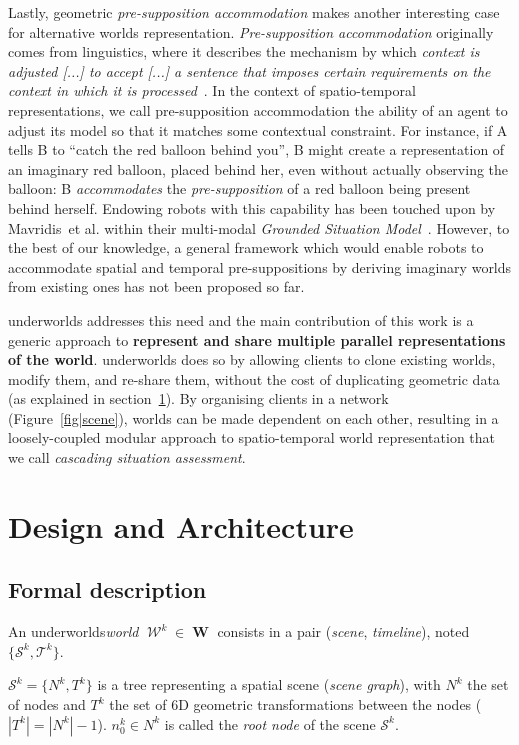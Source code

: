 \documentclass[letterpaper, 10pt, conference]{ieeeconf}
\newcommand{\etal}{et al.\xspace}
\newcommand{\uwds}{{\sc underworlds}\xspace}
\DeclareMathOperator{\W}{\mathcal{W}}
\DeclareMathOperator{\Ws}{\boldsymbol{W}}
\begin{document}
Lastly, geometric \emph{pre-supposition accommodation} makes another interesting
case for alternative worlds representation. \emph{Pre-supposition accommodation}
originally comes from linguistics, where it describes the mechanism by which
\emph{context is adjusted [...] to accept [...] a sentence that imposes certain
requirements on the context in which it is
processed}~\cite{vonfintel2008presupposition}. In the context of spatio-temporal
representations, we call pre-supposition accommodation the ability of an agent
to adjust its model so that it matches some contextual constraint. For instance,
if A tells B to ``catch the red balloon behind you'', B might create a
representation of an imaginary red balloon, placed behind her, even without
actually observing the balloon: B \emph{accommodates} the \emph{pre-supposition}
of a red balloon being present behind herself. Endowing robots with this
capability has been touched upon by Mavridis~\etal within their multi-modal
\emph{Grounded Situation Model}~\cite{Mavridis2006}. However, to the best of our
knowledge, a general framework which would enable robots to accommodate spatial
and temporal pre-suppositions by deriving imaginary worlds from existing ones
has not been proposed so far.

\uwds addresses this need and the main contribution of this work is a generic
approach to \textbf{represent and share multiple parallel representations of the
world}. \uwds does so by allowing clients to clone existing worlds, modify
them, and re-share them, without the cost of duplicating geometric data (as
explained in section~\ref{design}). By organising clients in a network
(Figure~\ref{fig|scene}), worlds can be made dependent on each other, resulting
in a loosely-coupled modular approach to spatio-temporal world representation
that we call \emph{cascading situation assessment}.


\section{Design and Architecture}
\label{design}

\subsection{Formal description}

An \uwds \emph{world} $\W^k \in \Ws$ consists in a pair (\emph{scene}, \emph{timeline}),
noted $\{\mathcal{S}^k,
\mathcal{T}^k\}$.

$\mathcal{S}^k=\{N^k, T^k\}$ is a tree representing a spatial scene (\emph{scene
graph}), with $N^k$ the set of nodes and $T^k$ the set of 6D geometric
transformations between the nodes ($|T^k| = |N^k| - 1$). $n^k_0 \in N^k$ is
called the \emph{root node} of the scene $\mathcal{S}^k$.
\end{document}
